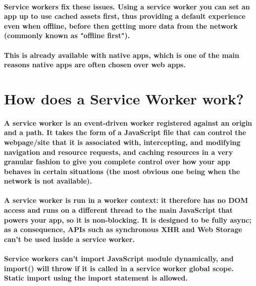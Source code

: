 \documentclass[12pt,a4paper]{article}
\begin{document}
    \paragraph{Service workers fix these issues. Using a service worker you can set an app up
    to use cached assets first, thus providing a default experience even when offline,
    before then getting more data from the network (commonly known as "offline first").}
    
    \paragraph{This is already available with native apps, which is one of the main reasons native
    apps are often chosen over web apps.}

    \section{How does a Service Worker work?}

    \paragraph{A service worker is an event-driven worker registered against an origin and a
    path. It takes the form of a JavaScript file that can control the webpage/site that it is
    associated with, intercepting, and modifying navigation and resource requests, and
    caching resources in a very granular fashion to give you complete control over how
    your app behaves in certain situations (the most obvious one being when the network
    is not available).}
    
    \paragraph{A service worker is run in a worker context: it therefore has no DOM access and runs on a different thread to the main JavaScript that powers your app, so it is non-blocking.
    It is designed to be fully async; as a consequence, APIs such as synchronous XHR
    and Web Storage can't be used inside a service worker.}
    
    \paragraph{Service workers can't import JavaScript module dynamically, and import() will throw if it is called in a service worker global scope. Static import using the import statement is allowed.}
    
\end{document}
